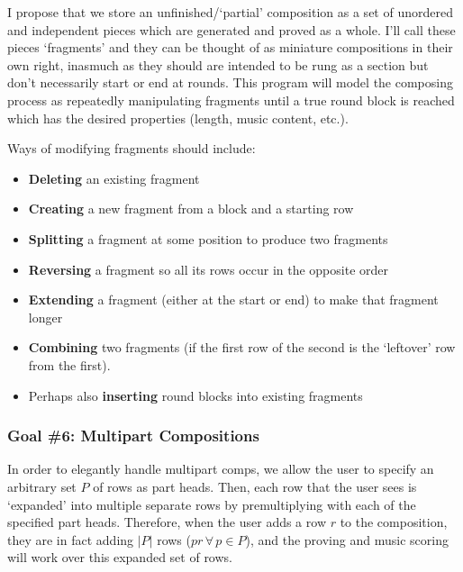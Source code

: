 \documentclass[12pt]{article}
\begin{document}
I propose that we store an unfinished/`partial' composition as a set of unordered and independent
pieces which are generated and proved as a whole.  I'll call these pieces `fragments' and they can
be thought of as miniature compositions in their own right, inasmuch as they should are intended to
be rung as a section but don't necessarily start or end at rounds.  This program will model the
composing process as repeatedly manipulating fragments until a true round block is reached which has
the desired properties (length, music content, etc.).

Ways of modifying fragments should include:

\begin{itemize}
    \item \textbf{Deleting} an existing fragment
    \item \textbf{Creating} a new fragment from a block and a starting row
    \item \textbf{Splitting} a fragment at some position to produce two fragments
    \item \textbf{Reversing} a fragment so all its rows occur in the opposite order
    \item \textbf{Extending} a fragment (either at the start or end) to make that fragment longer
    \item \textbf{Combining} two fragments (if the first row of the second is the `leftover' row
        from the first).
    \item Perhaps also \textbf{inserting} round blocks into existing fragments
\end{itemize}

\subsubsection{Goal \#6: Multipart Compositions}

In order to elegantly handle multipart comps, we allow the user to specify an arbitrary set $P$ of
rows as part heads.  Then, each row that the user sees is `expanded' into multiple separate rows by
premultiplying with each of the specified part heads.  Therefore, when the user adds a row $r$ to
the composition, they are in fact adding $|P|$ rows ($pr \, \forall \, p \in P$), and the proving
and music scoring will work over this expanded set of rows.
\end{document}

